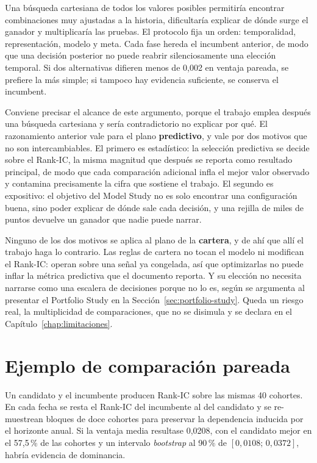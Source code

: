 Una búsqueda cartesiana de todos los valores posibles permitiría encontrar combinaciones muy
ajustadas a la historia, dificultaría explicar de dónde surge el ganador y multiplicaría las
pruebas. El protocolo fija un orden: temporalidad, representación, modelo y meta. Cada fase hereda
el incumbent anterior, de modo que una decisión posterior no puede reabrir silenciosamente una
elección temporal. Si dos alternativas difieren menos de 0,002 en ventaja pareada, se prefiere la
más simple; si tampoco hay evidencia suficiente, se conserva el incumbent.

Conviene precisar el alcance de este argumento, porque el trabajo emplea después una búsqueda
cartesiana y sería contradictorio no explicar por qué. El razonamiento anterior vale para el plano
\textbf{predictivo}, y vale por dos motivos que no son intercambiables. El primero es estadístico:
la selección predictiva se decide sobre el Rank-IC, la misma magnitud que después se reporta como
resultado principal, de modo que cada comparación adicional infla el mejor valor observado y
contamina precisamente la cifra que sostiene el trabajo. El segundo es expositivo: el objetivo del
Model Study no es solo encontrar una configuración buena, sino poder explicar de dónde sale cada
decisión, y una rejilla de miles de puntos devuelve un ganador que nadie puede narrar.

Ninguno de los dos motivos se aplica al plano de la \textbf{cartera}, y de ahí que allí el trabajo
haga lo contrario. Las reglas de cartera no tocan el modelo ni modifican el Rank-IC: operan sobre
una señal ya congelada, así que optimizarlas no puede inflar la métrica predictiva que el documento
reporta. Y su elección no necesita narrarse como una escalera de decisiones porque no lo es, según
se argumenta al presentar el Portfolio Study en la Sección~\ref{sec:portfolio-study}. Queda un
riesgo real, la multiplicidad de comparaciones, que no se disimula y se declara en el
Capítulo~\ref{chap:limitaciones}.

\section{Ejemplo de comparación pareada}

\begin{ejemplo}
Un candidato y el incumbente producen Rank-IC sobre las mismas 40 cohortes. En cada fecha se resta
el Rank-IC del incumbente al del candidato y se re-muestrean bloques de doce cohortes para preservar
la dependencia inducida por el horizonte anual. Si la ventaja media resultase 0,0208, con el
candidato mejor en el 57,5\,\% de las cohortes y un intervalo \textit{bootstrap} al 90\,\% de
$[0{,}0108;\,0{,}0372]$, habría evidencia de dominancia.
\end{ejemplo}

